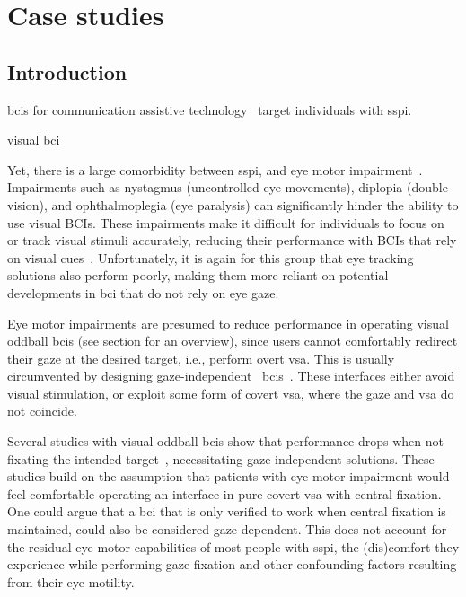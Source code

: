 \chapter{Case studies}
\label{sec:patients}
\section{Introduction}


\Acp{bci} for communication assistive technology~\cite{Millan2010}
target individuals with \ac{sspi}.

visual bci

Yet, there is a large comorbidity between \ac{sspi}, and eye motor impairment~\cite{FriedOken2020}.
Impairments such as nystagmus (uncontrolled eye movements), diplopia (double
vision), and ophthalmoplegia (eye paralysis) can significantly hinder
the ability to use visual BCIs. These impairments make it difficult for
individuals to focus on or track visual stimuli accurately, reducing their
performance with BCIs that rely on visual cues~\cite{McCane2014,FriedOken2020,Pasqualotto2015}.
Unfortunately, it is again for this group that eye tracking solutions also
perform poorly, making them more reliant on potential developments in \ac{bci}
that do not rely on eye gaze.

Eye motor impairments are presumed to reduce performance in operating visual
oddball \ac{bci}s (see section for an overview), since users
cannot comfortably redirect their gaze at the desired target,
i.e., perform overt \ac{vsa}.
This is usually circumvented by designing gaze-independent~
\acp{bci}~\cite{Riccio2012}.
These interfaces either avoid visual stimulation, or exploit some form of
covert \ac{vsa}, where the gaze and \ac{vsa} do not coincide.

Several studies with visual oddball \acp{bci} show that performance drops when not fixating the intended
target~\cite{Brunner2010, Treder2010, RonAngevin2019}, necessitating
gaze-independent solutions.
These studies build on the assumption that patients with eye motor impairment
would feel comfortable operating an interface in pure covert \ac{vsa} with
central fixation.
One could argue that a \ac{bci} that is only verified to work when central
fixation is maintained, could also be considered gaze-dependent.
This does not account for the residual eye motor capabilities of most people
with \ac{sspi}, the (dis)comfort they experience while
performing gaze fixation and other confounding factors resulting from their eye
motility.


